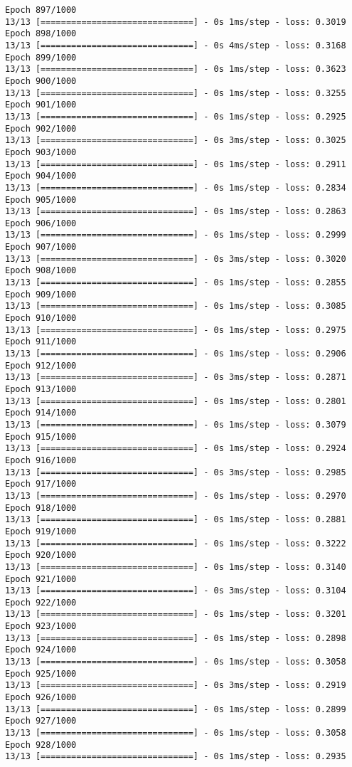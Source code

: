 \documentclass[11pt]{article}
\begin{document}
\begin{Verbatim}[commandchars=\\\{\}]
Epoch 897/1000
13/13 [==============================] - 0s 1ms/step - loss: 0.3019
Epoch 898/1000
13/13 [==============================] - 0s 4ms/step - loss: 0.3168
Epoch 899/1000
13/13 [==============================] - 0s 1ms/step - loss: 0.3623
Epoch 900/1000
13/13 [==============================] - 0s 1ms/step - loss: 0.3255
Epoch 901/1000
13/13 [==============================] - 0s 1ms/step - loss: 0.2925
Epoch 902/1000
13/13 [==============================] - 0s 3ms/step - loss: 0.3025
Epoch 903/1000
13/13 [==============================] - 0s 1ms/step - loss: 0.2911
Epoch 904/1000
13/13 [==============================] - 0s 1ms/step - loss: 0.2834
Epoch 905/1000
13/13 [==============================] - 0s 1ms/step - loss: 0.2863
Epoch 906/1000
13/13 [==============================] - 0s 1ms/step - loss: 0.2999
Epoch 907/1000
13/13 [==============================] - 0s 3ms/step - loss: 0.3020
Epoch 908/1000
13/13 [==============================] - 0s 1ms/step - loss: 0.2855
Epoch 909/1000
13/13 [==============================] - 0s 1ms/step - loss: 0.3085
Epoch 910/1000
13/13 [==============================] - 0s 1ms/step - loss: 0.2975
Epoch 911/1000
13/13 [==============================] - 0s 1ms/step - loss: 0.2906
Epoch 912/1000
13/13 [==============================] - 0s 3ms/step - loss: 0.2871
Epoch 913/1000
13/13 [==============================] - 0s 1ms/step - loss: 0.2801
Epoch 914/1000
13/13 [==============================] - 0s 1ms/step - loss: 0.3079
Epoch 915/1000
13/13 [==============================] - 0s 1ms/step - loss: 0.2924
Epoch 916/1000
13/13 [==============================] - 0s 3ms/step - loss: 0.2985
Epoch 917/1000
13/13 [==============================] - 0s 1ms/step - loss: 0.2970
Epoch 918/1000
13/13 [==============================] - 0s 1ms/step - loss: 0.2881
Epoch 919/1000
13/13 [==============================] - 0s 1ms/step - loss: 0.3222
Epoch 920/1000
13/13 [==============================] - 0s 1ms/step - loss: 0.3140
Epoch 921/1000
13/13 [==============================] - 0s 3ms/step - loss: 0.3104
Epoch 922/1000
13/13 [==============================] - 0s 1ms/step - loss: 0.3201
Epoch 923/1000
13/13 [==============================] - 0s 1ms/step - loss: 0.2898
Epoch 924/1000
13/13 [==============================] - 0s 1ms/step - loss: 0.3058
Epoch 925/1000
13/13 [==============================] - 0s 3ms/step - loss: 0.2919
Epoch 926/1000
13/13 [==============================] - 0s 1ms/step - loss: 0.2899
Epoch 927/1000
13/13 [==============================] - 0s 1ms/step - loss: 0.3058
Epoch 928/1000
13/13 [==============================] - 0s 1ms/step - loss: 0.2935

\end{Verbatim}
\end{document}
